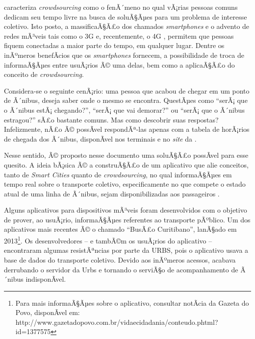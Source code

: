  caracteriza \textit{crowdsourcing} como o fenÃ´meno no qual vÃ¡rias pessoas comuns dedicam seu tempo livre na busca de soluÃ§Ãµes para um problema de interesse coletivo. Isto posto, a massificaÃ§Ã£o dos chamados \textit{smartphones} e o advento de redes mÃ³veis tais como o 3G e, recentemente, o 4G , permitem que pessoas fiquem conectadas a maior parte do tempo, em qualquer lugar. Dentre os inÃºmeros benefÃ­cios que os \textit{smartphones} fornecem, a possibilidade de troca de informaÃ§Ãµes entre usuÃ¡rios Ã© uma delas, bem como a aplicaÃ§Ã£o do conceito de \textit{crowdsourcing}.

Considera-se o seguinte cenÃ¡rio: uma pessoa que acabou de chegar em um ponto de Ã´nibus, deseja saber onde o mesmo se encontra. QuestÃµes como ``serÃ¡ que o Ã´nibus estÃ¡ chegando?'', ``serÃ¡ que vai demorar?'' ou ``serÃ¡ que o Ã´nibus estragou?'' sÃ£o bastante comuns. Mas como descobrir suas respostas? Infelizmente, nÃ£o Ã© possÃ­vel respondÃª-las apenas com a tabela de horÃ¡rios de chegada dos Ã´nibus, disponÃ­vel nos terminais e no \textit{site} da . 

Nesse sentido, Ã© proposto nesse documento uma soluÃ§Ã£o possÃ­vel para esse quesito. A ideia bÃ¡sica Ã© a construÃ§Ã£o de um aplicativo que alie conceitos, tanto de \textit{Smart Cities} quanto de \textit{crowdsourcing}, no qual informaÃ§Ãµes em tempo real sobre o transporte coletivo, especificamente no que compete o estado atual de uma linha de Ã´nibus, sejam disponibilizadas aos passageiros .


Alguns aplicativos para dispositivos mÃ³veis foram desenvolvidos com o objetivo de prover, ao usuÃ¡rio, informaÃ§Ãµes referentes ao transporte pÃºblico. Um dos aplicativos mais recentes Ã© o chamado ``BusÃ£o Curitibano'', lanÃ§ado em 2013\footnote{Para mais informaÃ§Ãµes sobre o aplicativo, consultar notÃ­cia da Gazeta do Povo, disponÃ­vel em:  http://www.gazetadopovo.com.br/vidaecidadania/conteudo.phtml?id=1377575}. Os desenvolvedores -- e tambÃ©m os usuÃ¡rios do aplicativo -- encontraram algumas resistÃªncias por parte da URBS, pois o aplicativo usava a base de dados do transporte coletivo. Devido aos inÃºmeros acessos, acabava derrubando o servidor da Urbs e tornando o serviÃ§o de acompanhamento de Ã´nibus indisponÃ­vel.

